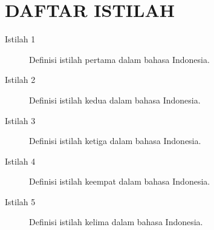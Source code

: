 \chapter*{DAFTAR ISTILAH}

\begin{description}
    \item[Istilah 1] Definisi istilah pertama dalam bahasa Indonesia.
    
    \item[Istilah 2] Definisi istilah kedua dalam bahasa Indonesia.
    
    \item[Istilah 3] Definisi istilah ketiga dalam bahasa Indonesia.
    
    \item[Istilah 4] Definisi istilah keempat dalam bahasa Indonesia.
    
    \item[Istilah 5] Definisi istilah kelima dalam bahasa Indonesia.
\end{description}